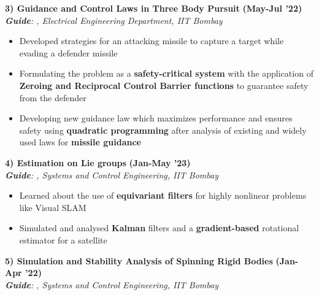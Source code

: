 \documentclass[10pt,letterpaper,sans]{moderncv}        %
\newcommand\y{4}
\begin{document}
\hrulefill{}
\vspace{\y pt}



\textbf{3) Guidance and Control Laws in Three Body Pursuit} \hfill \textbf{(May-Jul '22)}\\
\textit{\textbf{Guide}: , Electrical Engineering Department, IIT Bombay} 

\begin{itemize}
    \item Developed strategies for an attacking missile to capture a target while evading a defender missile
    \item Formulating the problem as a \textbf{safety-critical system} with the application of \textbf{Zeroing and Reciprocal Control Barrier functions} to guarantee safety from the defender
    \item Developing new guidance law which maximizes performance and ensures safety using \textbf{quadratic programming} after analysis of existing and widely used laws for \textbf{missile guidance}
\end{itemize}

\hrulefill{}
\vspace{\y pt}

\textbf{4) Estimation on Lie groups} \hfill \textbf{(Jan-May '23)}\\
\textit{\textbf{Guide}: , Systems and Control Engineering, IIT Bombay}

\begin{itemize}
    \item Learned about the use of \textbf{equivariant filters} for highly nonlinear problems like Visual SLAM
    \item Simulated and analysed \textbf{Kalman} filters and a \textbf{gradient-based} rotational estimator for a satellite
\end{itemize}

\hrulefill{}
\vspace{\y pt}

\textbf{5) Simulation and Stability Analysis of Spinning Rigid Bodies} \hfill \textbf{(Jan-Apr '22)}\\
\textit{\textbf{Guide}: , Systems and Control Engineering, IIT Bombay}
\end{document}

